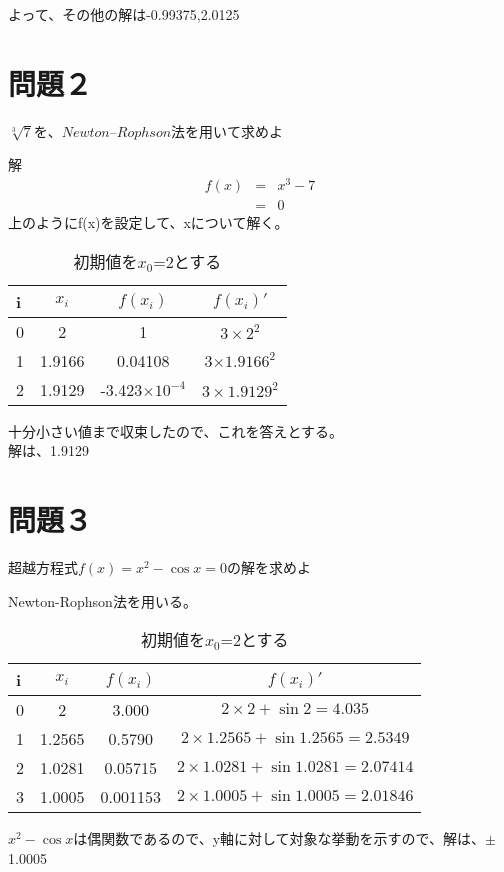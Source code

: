 \documentclass[a4j,twoside,openright,11pt]{jreport}
\begin{document}
よって、その他の解は-0.99375,2.0125
\section{問題２}
$\sqrt[3]{7}を、Newton$--$Rophson法を用いて求めよ$

解
\begin{eqnarray}
f(x)&=&x^3-7\nonumber\\
&=&0\nonumber
\end{eqnarray}
上のようにf(x)を設定して、xについて解く。

\begin{table}[htb]
\begin{center}
  \caption{初期値を$x_0$=2とする}
  \begin{tabular}{|l||c|c|c|} \hline
i&$x_i$&$f(x_i)$&$f(x_i)'$\\\hline
0&2    &1      &$3\times 2^2$\\
1&1.9166&0.04108&3$\times 1.9166^2$\\
2&1.9129&-3.423$\times 10^{-4}$ & $3\times 1.9129^2$\\\hline
  \end{tabular}
\end{center}
\end{table}

十分小さい値まで収束したので、これを答えとする。\\
解は、1.9129

\section{問題３}
超越方程式$f(x)=x^2-\cos{x}=0$の解を求めよ

Newton-Rophson法を用いる。

\begin{table}[htb]
\begin{center}
  \caption{初期値を$x_0$=2とする}
  \begin{tabular}{|l||c|c|c|} \hline
i&$x_i$ &$f(x_i)$&$f(x_i)'$\\\hline
0&2     &3.000  &$2\times 2 +\sin 2 = 4.035$\\
1&1.2565&0.5790 &$2\times 1.2565 + \sin 1.2565 = 2.5349$\\
2&1.0281&0.05715&$2\times 1.0281 + \sin 1.0281 = 2.07414$\\
3&1.0005&0.001153&$2\times 1.0005 + \sin 1.0005 = 2.01846$\\\hline
  \end{tabular}
\end{center}
\end{table}

$x^2-\cos x$は偶関数であるので、y軸に対して対象な挙動を示すので、解は、$\pm$1.0005
\end{document}
